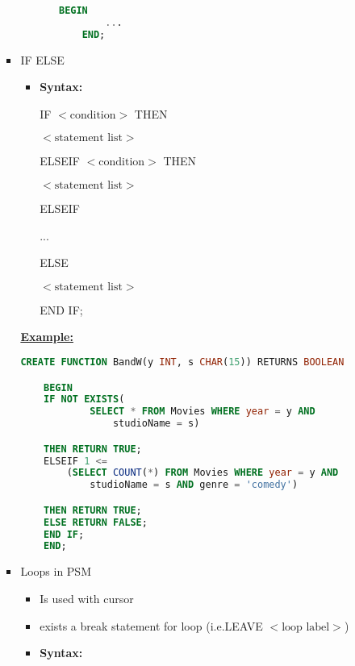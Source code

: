 \documentclass[12pt]{article}
\begin{document}
\begin{enumerate}[1.]
\begin{enumerate}[a)]
\begin{itemize}
\begin{enumerate}[1.]
\begin{itemize}
\begin{lstlisting}[language=SQL]
    BEGIN
        ...
    END;
    \end{lstlisting}
                \end{itemize}
            \end{enumerate}
            \item IF ELSE
            \begin{itemize}
                \item \textbf{Syntax:}

                \bigskip

                IF $<\text{condition}>$ THEN

                $<\text{statement list}>$

                ELSEIF $<\text{condition}>$ THEN

                $<\text{statement list}>$

                ELSEIF

                ...

                ELSE

                $<\text{statement list}>$

                END IF;
            \end{itemize}

            \bigskip

            \underline{\textbf{Example:}}

            \bigskip

    \begin{lstlisting}[language=SQL]
    CREATE FUNCTION BandW(y INT, s CHAR(15)) RETURNS BOOLEAN

    BEGIN
    IF NOT EXISTS(
            SELECT * FROM Movies WHERE year = y AND
                studioName = s)

    THEN RETURN TRUE;
    ELSEIF 1 <=
        (SELECT COUNT(*) FROM Movies WHERE year = y AND
            studioName = s AND genre = 'comedy')

    THEN RETURN TRUE;
    ELSE RETURN FALSE;
    END IF;
    END;
    \end{lstlisting}

        \item Loops in PSM
        \begin{itemize}
            \item Is used with cursor
            \item exists a break statement for loop (i.e.LEAVE $<\text{loop label}>$)
            \item \textbf{Syntax:}


\end{itemize}
\end{itemize}
\end{enumerate}
\end{enumerate}
\end{document}
